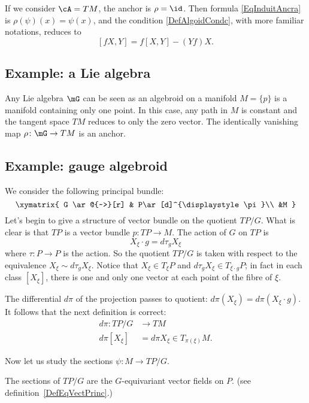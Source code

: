 If we consider $\cA=TM$, the anchor is $\rho=\id$. Then formula \eqref{EqInduitAncra} is $\rho(\psi)(x)=\psi(x)$, and the condition \eqref{DefAlgoidCondc}, with more familiar notations, reduces to
\[
  [fX,Y]=f[X,Y]-(Yf)X.
\]

\subsection{Example: a Lie algebra}

Any Lie algebra $\mG$ can be seen as an algebroid on a manifold $M=\{ p \}$ is a manifold containing only one point. In this case, any path in $M$ is constant and the tangent space $TM$ reduces to only the zero vector. The identically vanishing map $\rho\colon \mG\to TM$ is an anchor.

\subsection{Example: gauge algebroid}

We consider the following principal bundle:
\[
\xymatrix{
    G \ar@{~>}[r] & P\ar[d]^{\displaystyle \pi}\\ &M
  }
\]
Let's begin to give a structure of vector bundle on the quotient $TP/G$. What is clear is that $TP$ is a vector bundle $p\colon TP\to M$. The action of $G$ on $TP$ is
\[
  X_{\xi}\cdot g=d\tau_{g}X_{\xi}
\]
where $\tau\colon P\to P$ is the action. So the quotient $TP/G$ is taken with respect to the equivalence $X_{\xi}\sim d\tau_{g}X_{\xi}$. Notice that $X_{\xi}\in T_{\xi}P$ and $d\tau_{g}X_{\xi}\in T_{\xi\cdot g}P$; in fact in each class $[X_{\xi}]$, there is one and only one vector at each point of the fibre of $\xi$.

The differential $d\pi$ of the projection passes to quotient: $d\pi(X_{\xi})=d\pi(X_{\xi}\cdot g)$. It follows that the next definition is correct:
\begin{equation}
\begin{aligned}
 d\pi\colon TP/G&\to TM \\
d\pi[X_{\xi}]&= d\pi X_{\xi}\in T_{\pi(\xi)}M.
\end{aligned}
\end{equation}

Now let us study the sections $\psi\colon M\to TP/G$.

\begin{lemma}
The sections of $TP/G$ are the $G$-equivariant vector fields on $P$. (see definition~\ref{DefEqVectPrinc}.)
\end{lemma}

